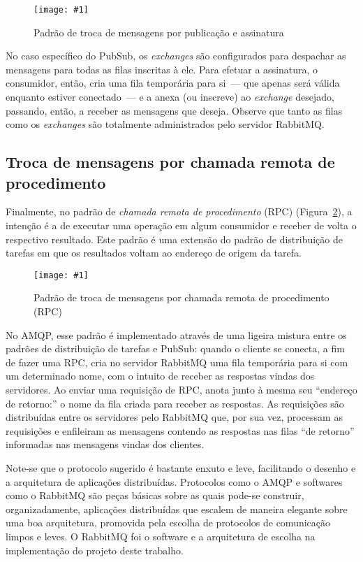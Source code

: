 \documentclass[ruledheader, 12pt]{abnt}
\newcommand{\figcustom}[4]{\par
	\begin{figure}[#3]
		\centering
		\texttt{[image: \#1]}
		\caption{\label{fig:#1}#2}
	\end{figure}
\par}
\newcommand{\figref}[1]{(Figura~\ref{fig:#1})}
\begin{document}
\figcustom{rabbitmq-pubsub}{Padrão de troca de mensagens por publicação e assinatura}{bp}{1}

No caso específico do PubSub, os \emph{exchanges} são configurados para despachar as mensagens para todas as filas inscritas à ele. Para efetuar a assinatura, o consumidor, então, cria uma fila temporária para si~--- que apenas será válida enquanto estiver conectado~--- e a anexa (ou inscreve) ao \emph{exchange} desejado, passando, então, a receber as mensagens que deseja. Observe que tanto as filas como os \emph{exchanges} são totalmente administrados pelo servidor RabbitMQ.

\subsection{Troca de mensagens por chamada remota de procedimento}


Finalmente, no padrão de \emph{chamada remota de procedimento} (RPC) \figref{rabbitmq-rpc}, a intenção é a de executar uma operação em algum consumidor e receber de volta o respectivo resultado. Este padrão é uma extensão do padrão de distribuição de tarefas em que os resultados voltam ao endereço de origem da tarefa.

\figcustom{rabbitmq-rpc}{Padrão de troca de mensagens por chamada remota de procedimento (RPC)}{p}{1}

No AMQP, esse padrão é implementado através de uma ligeira mistura entre os padrões de distribuição de tarefas e PubSub: quando o cliente se conecta, a fim de fazer uma RPC, cria no servidor RabbitMQ uma fila temporária para si com um determinado nome, com o intuito de receber as respostas vindas dos servidores. Ao enviar uma requisição de RPC, anota junto à mesma seu ``endereço de retorno:'' o nome da fila criada para receber as respostas. As requisições são distribuídas entre os servidores pelo RabbitMQ que, por sua vez, processam as requisições e enfileiram as mensagens contendo as respostas nas filas ``de retorno'' informadas nas mensagens vindas dos clientes.



Note-se que o protocolo sugerido é bastante enxuto e leve, facilitando o desenho e a arquitetura de aplicações distribuídas. Protocolos como o AMQP e softwares como o RabbitMQ são peças básicas sobre as quais pode-se construir, organizadamente, aplicações distribuídas que escalem de maneira elegante sobre uma boa arquitetura, promovida pela escolha de protocolos de comunicação limpos e leves. O RabbitMQ foi o software e a arquitetura de escolha na implementação do projeto deste trabalho.
\end{document}
